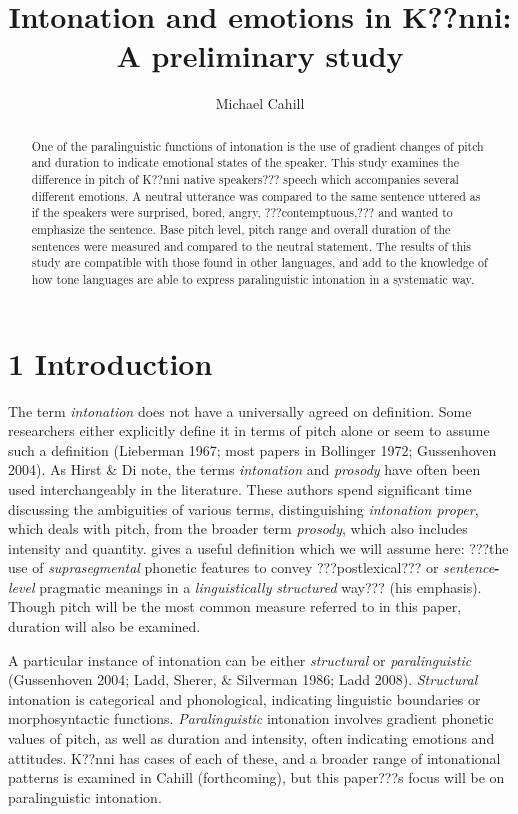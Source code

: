 \documentclass[output=paper]{langsci/langscibook}
\title{Intonation and emotions in {K??nni}: {A} preliminary study}
\author{%
 Michael Cahill\affiliation{Cahill affiliation} 
}
\begin{document}
\begin{abstract}
One of the paralinguistic functions of intonation is the use of gradient changes of pitch and duration to indicate emotional states of the speaker. This study examines the difference in pitch of K??nni native speakers??? speech which accompanies several different emotions. A neutral utterance was compared to the same sentence uttered as if the speakers were surprised, bored, angry, ???contemptuous,??? and wanted to emphasize the sentence. Base pitch level, pitch range and overall duration of the sentences were measured and compared to the neutral statement. The results of this study are compatible with those found in other languages, and add to the knowledge of how tone languages are able to express paralinguistic intonation in a systematic way.
\end{abstract}

\section{1 Introduction}
\begin{styleBodyTextIndent}
The term \emph{intonation} does not have a universally agreed on definition. Some researchers either explicitly define it in terms of pitch alone or seem to assume such a definition (Lieberman 1967; most papers in Bollinger 1972; Gussenhoven 2004). As Hirst \& Di\citet[3]{Canio1998} note, the terms \emph{intonation} and \emph{prosody} have often been used interchangeably in the literature. These authors spend significant time discussing the ambiguities of various terms, distinguishing \emph{intonation proper}, which deals with pitch, from the broader term \emph{prosody},\emph{ }which also includes intensity and quantity. \citet[4]{Ladd2008} gives a useful definition which we will assume here: ???the use of \emph{suprasegmental} phonetic features to convey ???postlexical??? or \emph{sentence}\textbf{{}-}\emph{level}\textbf{ }pragmatic meanings in a \emph{linguistically}\textbf{ }\emph{structured}\textbf{ }way??? (his emphasis). Though pitch will be the most common measure referred to in this paper, duration will also be examined. 
\end{styleBodyTextIndent}

A particular instance of intonation can be either \emph{structural} or \emph{paralinguistic} (Gussenhoven 2004; Ladd, Sherer, \& Silverman 1986; Ladd 2008). \emph{Structural} intonation is categorical and phonological, indicating linguistic boundaries or morphosyntactic functions. \emph{Paralinguistic} intonation involves gradient phonetic values of pitch, as well as duration and intensity, often indicating emotions and attitudes. K??nni has cases of each of these, and a broader range of intonational patterns is examined in Cahill (forthcoming), but this paper???s focus will be on paralinguistic intonation.
\end{document}
